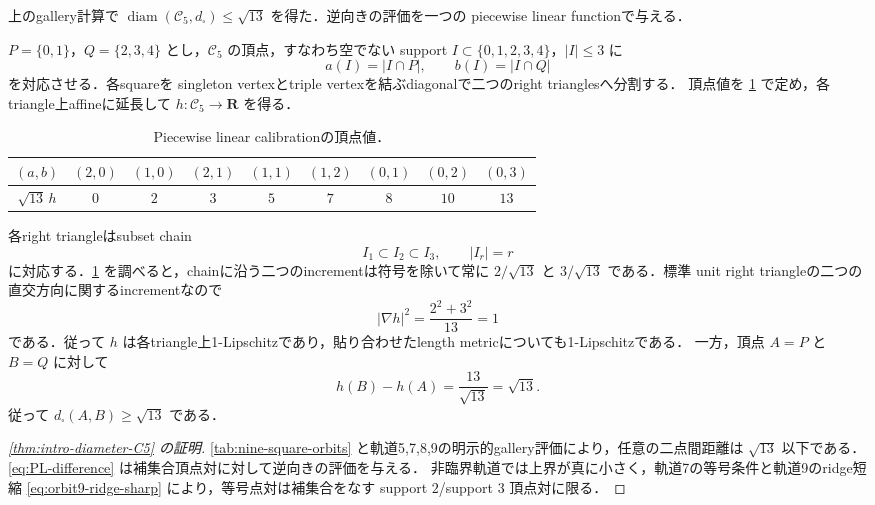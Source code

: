 \documentclass[a4paper,11pt]{ltjsarticle}
\numberwithin{equation}{section}
\theoremstyle{plain}
\theoremstyle{definition}
\theoremstyle{remark}
\newcommand{\RR}{\mathbf R}
\newcommand{\cC}{\mathcal C}
\newcommand{\diam}{\operatorname{diam}}
\begin{document}
上のgallery計算で $\diam(\cC_5,d_\square)\le\sqrt{13}$ を得た．逆向きの評価を一つの
piecewise linear functionで与える．

$P=\{0,1\}$，$Q=\{2,3,4\}$ とし，$\cC_5$ の頂点，すなわち空でない support
$I\subset\{0,1,2,3,4\}$，$|I|\le3$ に
\begin{equation}\label{eq:ab-support}
 a(I)=|I\cap P|,
 \qquad b(I)=|I\cap Q|
\end{equation}
を対応させる．各squareを singleton vertexとtriple vertexを結ぶdiagonalで二つのright trianglesへ分割する．
頂点値を \cref{tab:PL-calibration} で定め，各triangle上affineに延長して $h:\cC_5\to\RR$ を得る．

\begin{table}[htbp]
\centering
\small
\caption{Piecewise linear calibrationの頂点値．}
\label{tab:PL-calibration}
\begin{tabular}{@{}c c c c c c c c c@{}}
\toprule
$(a,b)$ & $(2,0)$ & $(1,0)$ & $(2,1)$ & $(1,1)$ & $(1,2)$ & $(0,1)$ & $(0,2)$ & $(0,3)$\\
\midrule
$\sqrt{13}\,h$ & $0$ & $2$ & $3$ & $5$ & $7$ & $8$ & $10$ & $13$\\
\bottomrule
\end{tabular}
\end{table}

各right triangleはsubset chain
\begin{equation}\label{eq:subset-chain-triangle}
 I_1\subset I_2\subset I_3,
 \qquad |I_r|=r
\end{equation}
に対応する．\cref{tab:PL-calibration} を調べると，chainに沿う二つのincrementは符号を除いて常に
$2/\sqrt{13}$ と $3/\sqrt{13}$ である．標準 unit right triangleの二つの直交方向に関するincrementなので
\begin{equation}\label{eq:PL-gradient-one}
 |\nabla h|^2=\frac{2^2+3^2}{13}=1
\end{equation}
である．従って $h$ は各triangle上1-Lipschitzであり，貼り合わせたlength metricについても1-Lipschitzである．
一方，頂点 $A=P$ と $B=Q$ に対して
\begin{equation}\label{eq:PL-difference}
 h(B)-h(A)=\frac{13}{\sqrt{13}}=\sqrt{13}.
\end{equation}
従って $d_\square(A,B)\ge\sqrt{13}$ である．

\begin{proof}[\cref{thm:intro-diameter-C5} の証明]
\cref{tab:nine-square-orbits} と軌道5,7,8,9の明示的gallery評価により，任意の二点間距離は
$\sqrt{13}$ 以下である．\cref{eq:PL-difference} は補集合頂点対に対して逆向きの評価を与える．
非臨界軌道では上界が真に小さく，軌道7の等号条件と軌道9のridge短縮
\eqref{eq:orbit9-ridge-sharp} により，等号点対は補集合をなす support $2$/support $3$ 頂点対に限る．
\end{proof}
\end{document}
